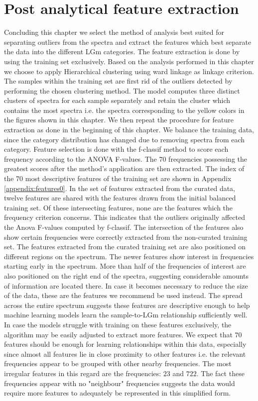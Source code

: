 \section{Post analytical feature extraction}
Concluding this chapter we select the method of analysis best suited for separating outliers from the spectra and extract the features which best separate the data into the different LGm categories. The feature extraction is done by using the training set exclusively. Based on the analysis performed in this chapter we choose to apply Hierarchical clustering using ward linkage as linkage criterion. The samples within the training set are first rid of the outliers detected by performing the chosen clustering method. The model computes three distinct clusters of spectra for each sample separately and retain the cluster which contains the most spectra i.e. the spectra corresponding to the yellow colors in the figures shown in this chapter. We then repeat the procedure for feature extraction as done in the beginning of this chapter. We balance the training data, since the category distribution has changed due to removing spectra from each category. Feature selection is done with the f-classif method to score each frequency according to the ANOVA F-values. The 70 frequencies possessing the greatest scores after the method's application are then extracted. The index of the 70 most descriptive features of the training set are shown in Appendix \ref{appendix:features0}. In the set of features extracted from the curated data, twelve features are shared with the features drawn from the initial balanced training set. Of these intersecting features, none are the features which the frequency criterion concerns. This indicates that the outliers originally affected the Anova F-values computed by f-classif. The intersection of the features also show certain frequencies were correctly extracted from the non-curated training set. The features extracted from the curated training set are also positioned on different regions on the spectrum. The newer features show interest in frequencies starting early in the spectrum. More than half of the frequencies of interest are also positioned on the right end of the spectra, suggesting considerable amounts of information are located there. In case it becomes necessary to reduce the size of the data, these are the features we recommend be used instead. The spread across the entire spectrum suggests these features are descriptive enough to help machine learning models learn the sample-to-LGm relationship sufficiently well. In case the models struggle with training on these features exclusively, the algorithm may be easily adjusted to extract more features. We expect that $70$ features should be enough for learning relationships within this data, especially since almost all features lie in close proximity to other features i.e. the relevant frequencies appear to be grouped with other nearby frequencies. The most irregular features in this regard are the frequencies: $23$ and $722$. The fact these frequencies appear with no "neighbour" frequencies suggests the data would require more features to adequately be represented in this simplified form. 